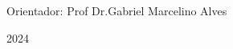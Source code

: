 \begin{center}
   	
   	\ABNTEXchapterfont\Large\textsc{\imprimirautor}
   	\vspace{2.5cm}
   	
   	\ABNTEXchapterfont\LARGE\textsc{\imprimirtitulo\ifdef{\osubtitulo}{:}{}}

    \ifdef{\osubtitulo}{\ABNTEXchapterfont\Large\imprimirsubtitulo}{}
   	\vspace{2.5cm}
   	   	
   	\hspace{.4\textwidth}
   	\begin{minipage}{.5\textwidth}
   		\SingleSpacing
   		
   		\vspace{\onelineskip}
   		
   		Orientador: Prof Dr.Gabriel Marcelino Alves
        
        
   		
   	\end{minipage}%
    \vfill
   	
   	\Large\textsc{\imprimirlocal}
   	
   	\Large\textsc{2024}
   	
   	\vspace*{4cm}
   	\pagebreak
\end{center}